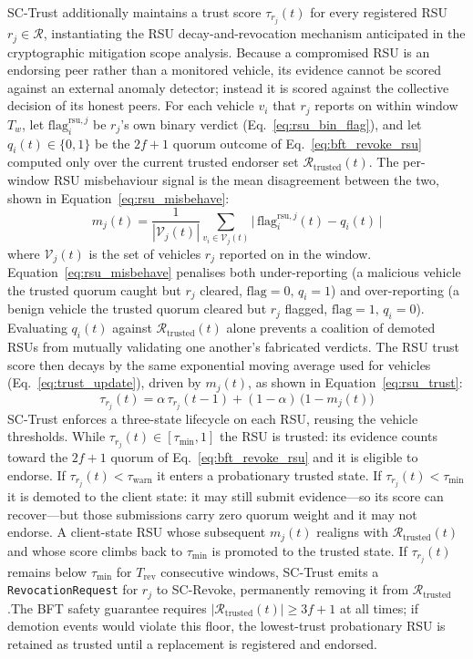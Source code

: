 \documentclass[12pt, a4paper]{report}
\begin{document}
SC-Trust additionally maintains a trust score $\tau_{r_j}(t)$ for
every registered RSU $r_j \in \mathcal{R}$, instantiating the RSU
decay-and-revocation mechanism anticipated in the cryptographic
mitigation scope analysis. Because a compromised RSU is an endorsing
peer rather than a monitored vehicle, its evidence cannot be scored
against an external anomaly detector; instead it is scored against the
collective decision of its honest peers. For each vehicle $v_i$ that
$r_j$ reports on within window $T_w$, let
$\mathrm{flag}_i^{\mathrm{rsu},j}$ be $r_j$'s own binary verdict
(Eq.~\eqref{eq:rsu_bin_flag}), and let $q_i(t)\in\{0,1\}$ be the
$2f+1$ quorum outcome of Eq.~\eqref{eq:bft_revoke_rsu} computed
only over the current trusted endorser set
$\mathcal{R}_{\mathrm{trusted}}(t)$. The per-window RSU misbehaviour
signal is the mean disagreement between the two, shown in
Equation~\eqref{eq:rsu_misbehave}:
\begin{equation}
  m_j(t) = \frac{1}{|\mathcal{V}_j(t)|}
    \sum_{v_i \in \mathcal{V}_j(t)}
    \bigl|\,\mathrm{flag}_i^{\mathrm{rsu},j}(t) - q_i(t)\,\bigr|
  \label{eq:rsu_misbehave}
\end{equation}
where $\mathcal{V}_j(t)$ is the set of vehicles $r_j$ reported on in
the window. Equation~\eqref{eq:rsu_misbehave} penalises both
under-reporting (a malicious vehicle the trusted quorum caught
but $r_j$ cleared, $\mathrm{flag}=0,\,q_i=1$) and
over-reporting (a benign vehicle the trusted quorum cleared but
$r_j$ flagged, $\mathrm{flag}=1,\,q_i=0$). Evaluating $q_i(t)$ against
$\mathcal{R}_{\mathrm{trusted}}(t)$ alone prevents a coalition of
demoted RSUs from mutually validating one another's fabricated
verdicts. The RSU trust score then decays by the same exponential
moving average used for vehicles (Eq.~\eqref{eq:trust_update}), driven
by $m_j(t)$, as shown in Equation~\eqref{eq:rsu_trust}:
\begin{equation}
  \tau_{r_j}(t) = \alpha\,\tau_{r_j}(t-1)
    + (1-\alpha)\,\bigl(1 - m_j(t)\bigr)
  \label{eq:rsu_trust}
\end{equation}
SC-Trust enforces a three-state lifecycle on each RSU, reusing the
vehicle thresholds. While $\tau_{r_j}(t)\in[\tau_{\min},1]$ the RSU is
trusted: its evidence counts toward the $2f+1$ quorum of
Eq.~\eqref{eq:bft_revoke_rsu} and it is eligible to endorse. If
$\tau_{r_j}(t)<\tau_{\mathrm{warn}}$ it enters a probationary
trusted state. If $\tau_{r_j}(t)<\tau_{\min}$ it is demoted to the
client state: it may still submit evidence---so its score can
recover---but those submissions carry zero quorum weight and it may
not endorse. A client-state RSU whose subsequent $m_j(t)$ realigns
with $\mathcal{R}_{\mathrm{trusted}}(t)$ and whose score climbs back
to $\tau_{\min}$ is promoted to the trusted state. If $\tau_{r_j}(t)$
remains below $\tau_{\min}$ for $T_{\mathrm{rev}}$ consecutive windows,
SC-Trust emits a \texttt{RevocationRequest} for $r_j$ to SC-Revoke,
permanently removing it from $\mathcal{R}_{\mathrm{trusted}}$.The BFT safety guarantee requires $|\mathcal{R}_{\mathrm{trusted}}(t)| \geq 3f+1$ at all times; if demotion events would violate this floor, the lowest-trust probationary RSU is retained as trusted until a replacement is registered and endorsed.
\end{document}
